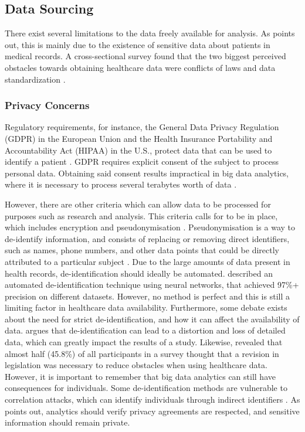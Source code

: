 \documentclass[a4paper,12pt]{article}
\begin{document}
\subsection{Data Sourcing}

There exist several limitations to the data freely available for analysis.
As \textcite[2]{Dalianis2015} points out, this is mainly due to the existence of sensitive data about patients in medical records.
A cross-sectional survey found that the two biggest perceived obstacles towards obtaining healthcare data were conflicts of laws and data standardization \parencite{Kim2019}.

\subsubsection{Privacy Concerns}

Regulatory requirements, for instance, the General Data Privacy Regulation (GDPR) in the European Union and the Health Insurance Portability and Accountability Act (HIPAA) in the U.S., protect data that can be used to identify a patient \parencite{Iyengar2018}.
GDPR requires explicit consent of the subject to process personal data. Obtaining said consent results impractical in big data analytics, where it is necessary to process several terabytes worth of data \parencite{Hintze2018}.

However, there are other criteria which can allow data to be processed for purposes such as research and analysis.
This criteria calls for  to be in place, which includes encryption and pseudonymisation \parencite[151]{Hintze2018}.
Pseudonymisation is a way to de-identify information, and consists of replacing or removing direct identifiers, such as names, phone numbers, and other data points that could be directly attributed to a particular subject \parencite[146-147]{Hintze2018}.
Due to the large amounts of data present in health records, de-identification should ideally be automated.
\textcite{Dernoncourt2016} described an automated de-identification technique using neural networks, that achieved 97\%+ precision on different datasets.
However, no method is perfect and this is still a limiting factor in healthcare data availability.
Furthermore, some debate exists about the need for strict de-identification, and how it can affect the availability of data.
\textcite[2]{Shin2018} argues that de-identification can lead to a distortion and loss of detailed data, which can greatly impact the results of a study.
Likewise, \textcite{Kim2019} revealed that almost half (45.8\%) of all participants in a survey thought that a revision in legislation was necessary to reduce obstacles when using healthcare data.
However, it is important to remember that big data analytics can still have consequences for individuals.
Some de-identification methods are vulnerable to correlation attacks, which can identify individuals through indirect identifiers \parencite{Abouelmehdi2018}.
As \textcite{Abouelmehdi2018} points out, analytics should verify privacy agreements are respected, and sensitive information should remain private.
\end{document}
